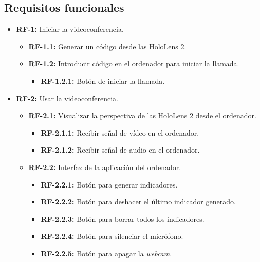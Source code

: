 \subsection{Requisitos funcionales}
\begin{itemize}
\tightlist
\item
    \textbf{RF-1:} Iniciar la videoconferencia.
    
    \begin{itemize}
    \tightlist
    \item
        \textbf{RF-1.1:} Generar un código desde las HoloLens 2.
    \item
        \textbf{RF-1.2:} Introducir código en el ordenador para iniciar la llamada.
        \begin{itemize}
        \tightlist
        \item
            \textbf{RF-1.2.1:} Botón de iniciar la llamada.
        \end{itemize}
    \end{itemize}
\item
    \textbf{RF-2:} Usar la videoconferencia.
    \begin{itemize}
    \tightlist
    \item
        \textbf{RF-2.1:} Visualizar la perspectiva de las HoloLens 2 desde el ordenador.
        \begin{itemize}
        \tightlist
        \item
            \textbf{RF-2.1.1:} Recibir señal de vídeo en el ordenador.
        \item
            \textbf{RF-2.1.2:} Recibir señal de audio en el ordenador.
        \end{itemize}
    \item
        \textbf{RF-2.2:} Interfaz de la aplicación del ordenador.
        \begin{itemize}
        \tightlist
        \item
            \textbf{RF-2.2.1:} Botón para generar indicadores.
        \item
            \textbf{RF-2.2.2:} Botón para deshacer el último indicador generado.
        \item
            \textbf{RF-2.2.3:} Botón para borrar todos los indicadores.
        \item
            \textbf{RF-2.2.4:} Botón para silenciar el micrófono.
        \item
            \textbf{RF-2.2.5:} Botón para apagar la \textit{webcam}.
        \end{itemize}

\end{itemize}
\end{itemize}

